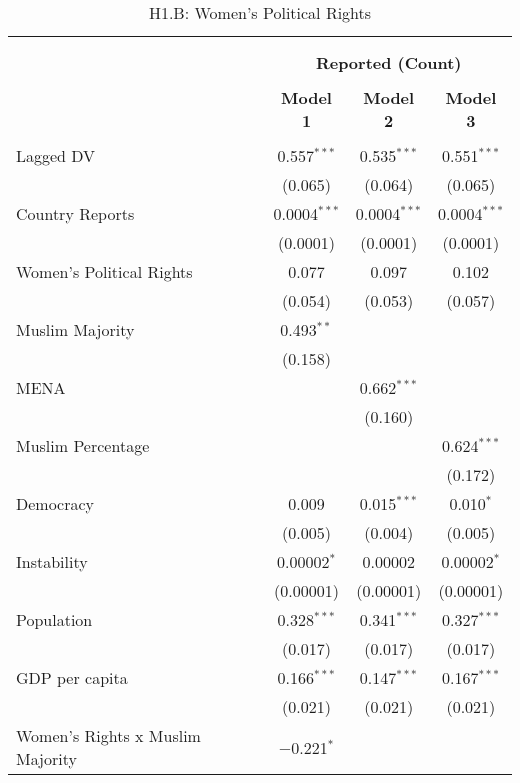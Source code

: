 
\begin{table}[!htbp] \centering 
  \caption{H1.B: Women's Political Rights} 
  \label{} 
\begin{tabular}{@{\extracolsep{5pt}}lccc} 
\\[-1.8ex]\hline \\[-1.8ex] 
\\[-1.8ex] & \multicolumn{3}{c}{\textbf{Reported (Count)}} \\ 
\\[-1.8ex] & \textbf{Model 1} & \textbf{Model 2} & \textbf{Model 3}\\ 
\hline \\[-1.8ex] 
 Lagged DV & 0.557$^{***}$ & 0.535$^{***}$ & 0.551$^{***}$ \\ 
  & (0.065) & (0.064) & (0.065) \\ 
  Country Reports & 0.0004$^{***}$ & 0.0004$^{***}$ & 0.0004$^{***}$ \\ 
  & (0.0001) & (0.0001) & (0.0001) \\ 
  Women's Political Rights & 0.077 & 0.097 & 0.102 \\ 
  & (0.054) & (0.053) & (0.057) \\ 
  Muslim Majority & 0.493$^{**}$ &  &  \\ 
  & (0.158) &  &  \\ 
  MENA &  & 0.662$^{***}$ &  \\ 
  &  & (0.160) &  \\ 
  Muslim Percentage &  &  & 0.624$^{***}$ \\ 
  &  &  & (0.172) \\ 
  Democracy & 0.009 & 0.015$^{***}$ & 0.010$^{*}$ \\ 
  & (0.005) & (0.004) & (0.005) \\ 
  Instability & 0.00002$^{*}$ & 0.00002 & 0.00002$^{*}$ \\ 
  & (0.00001) & (0.00001) & (0.00001) \\ 
  Population & 0.328$^{***}$ & 0.341$^{***}$ & 0.327$^{***}$ \\ 
  & (0.017) & (0.017) & (0.017) \\ 
  GDP per capita & 0.166$^{***}$ & 0.147$^{***}$ & 0.167$^{***}$ \\ 
  & (0.021) & (0.021) & (0.021) \\ 
  Women's Rights x Muslim Majority & $-$0.221$^{*}$ &  &  \\ 

\end{tabular}
\end{table}
